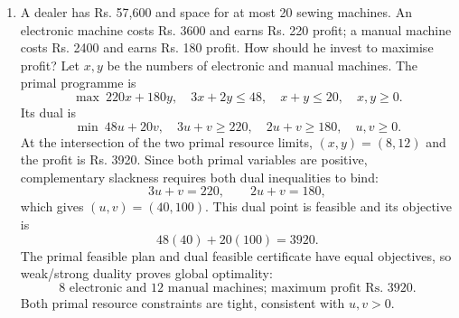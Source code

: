 \begin{enumerate}[leftmargin=4mm,itemsep=9pt]
\[\[\[\[\[\addtocounter{enumi}{1}
\item Solve graphically: minimise $z=3x+5y$ subject to $x+2y\ge10$, $x+y\ge6$, $3x+y\ge8$, $x,y\ge0$.
\solution The primal linear programme is
\[
\min\ 3x+5y\quad\text{subject to}\quad
Ax\ge b,\quad x\ge0,
\]
where $A=\begin{pmatrix}1&2\\1&1\\3&1\end{pmatrix}$, $b=(10,6,8)^T$. Its dual is
\[
\max\ 10u_1+6u_2+8u_3
\quad\text{subject to}\quad
u_1+u_2+3u_3\le3,\quad
2u_1+u_2+u_3\le5,\quad u\ge0.
\]
The feasible primal point $(x,y)=(2,4)$ has objective 26 and satisfies the first two primal constraints with equality; the third has slack 2. The dual point $u=(2,1,0)$ is feasible and has objective $20+6=26$. Weak duality bounds every primal objective below by every dual feasible value. Since the feasible values agree, strong duality certifies
\[
\boxed{x=2,\quad y=4,\quad z_{\min}=26}.
\]
Complementary slackness also holds: $u_1,u_2>0$ correspond to tight primal constraints, $u_3=0$ corresponds to the slack third constraint, and both positive primal variables force their dual constraints to be tight.

\item A dealer has Rs. 57,600 and space for at most 20 sewing machines. An electronic machine costs Rs. 3600 and earns Rs. 220 profit; a manual machine costs Rs. 2400 and earns Rs. 180 profit. How should he invest to maximise profit?
\solution Let $x,y$ be the numbers of electronic and manual machines. The primal programme is
\[
\max\ 220x+180y,\quad
3x+2y\le48,\quad x+y\le20,\quad x,y\ge0.
\]
Its dual is
\[
\min\ 48u+20v,\quad
3u+v\ge220,\quad2u+v\ge180,\quad u,v\ge0.
\]
At the intersection of the two primal resource limits, $(x,y)=(8,12)$ and the profit is Rs. 3920. Since both primal variables are positive, complementary slackness requires both dual inequalities to bind:
\[
3u+v=220,\qquad2u+v=180,
\]
which gives $(u,v)=(40,100)$. This dual point is feasible and its objective is
\[
48(40)+20(100)=3920.
\]
The primal feasible plan and dual feasible certificate have equal objectives, so weak/strong duality proves global optimality:
\[
\boxed{8\text{ electronic and }12\text{ manual machines; maximum profit Rs. }3920}.
\]
Both primal resource constraints are tight, consistent with $u,v>0$.

\]\]\]\]\]
\end{enumerate}
